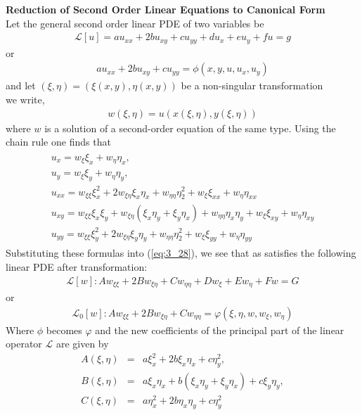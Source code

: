 \documentclass[11pt]{report}
\newcommand{\Laplace}{\mathcal{L}}
\newcommand{\sbracket}[1]{\left[#1\right]}
\newcommand{\NI}{\noindent}
\newcommand{\LFn}[1]{\Laplace \sbracket{#1}}
\newcommand{\sps}{\\[0.2cm]}
\newcommand{\refn}[1]{(\ref{#1})}
\newcommand{\refx}[1]{\refn{eq:#1}}
\newcommand{\bt}[1]{\textbf{#1}}
\begin{document}
	\NI\bt{Reduction of Second Order Linear Equations to Canonical Form}\\
	Let the general second order linear PDE of two variables be
	\begin{eqnarray}
		\LFn{u} = au_{xx} + 2bu_{xy} + cu_{yy} + du_x + eu_y + fu = g\label{eq:3_28}
	\end{eqnarray}
	or
	\begin{eqnarray}
		au_{xx} + 2bu_{xy} + cu_{yy} = \phi(x,y,u,u_x,u_y)\label{eq:3_29}
	\end{eqnarray}
	and let $(\xi,\eta) = (\xi(x,y),\eta(x,y))$ be a non-singular transformation\\
	we write,
	\begin{eqnarray}
		w(\xi,\eta) = u(x(\xi,\eta),y(\xi,\eta))\label{eq:3_30}
	\end{eqnarray}
	where $w$ is a solution of a second-order equation of the same type. Using the chain rule one finds that
	\begin{eqnarray}
		 \begin{array}{l}
			u_x = w_\xi\xi_x + w_\eta\eta_x,\\
			u_y = w_\xi\xi_y + w_\eta\eta_y,\\
			u_{xx} = w_{\xi\xi}\xi^2_x + 2w_{\xi\eta}\xi_x\eta_x + w_{\eta\eta}\eta^2_2 + w_\xi\xi_{xx}+w_\eta\eta_{xx}\\
			u_{xy} = w_{\xi\xi}\xi_x\xi_y + w_{\xi\eta}(\xi_x\eta_y + \xi_y\eta_x) + w_{\eta\eta}\eta_x\eta_y + w_\xi\xi_{xy} + w_\eta\eta_{xy}\\
			u_{yy} = w_{\xi\xi}\xi^2_y + 2w_{\xi\eta}\xi_y\eta_y + w_{\eta\eta}\eta^2_2 + w_\xi\xi_{yy}+w_\eta\eta_{yy}
		\end{array}\label{eq:3_31}
	\end{eqnarray}
	Substituting these formulas into \refx{3_28}, we see that as satisfies the following linear PDE after transformation:
	\begin{eqnarray}
		\LFn{w}: Aw_{\xi\xi} + 2Bw_{\xi\eta} + Cw_{\eta\eta} + Dw_\xi + Ew_\eta + Fw = G\label{eq:3_32}
	\end{eqnarray}
	or
	\begin{eqnarray}
		\Laplace_0[w]: Aw_{\xi\xi} + 2Bw_{\xi\eta} + Cw_{\eta\eta} = \varphi(\xi,\eta,w,w_\xi,w_\eta)\label{eq:3_33}
	\end{eqnarray}
	Where $\phi$ becomes $\varphi$ and the new coefficients of the principal part of the linear operator $\Laplace$ are given by
	\begin{eqnarray*}
		A(\xi,\eta) &=& a\xi^2_x + 2b\xi_x\eta_x + c\eta^2_y,\sps
		B(\xi,\eta) &=& a\xi_x\eta_x + b(\xi_x\eta_y + \xi_y\eta_x) + c\xi_y\eta_y,\sps
		C(\xi,\eta) &=& a\eta_x^2 + 2b\eta_x\eta_y + c\eta_y^2
	\end{eqnarray*}
	
\end{document}
